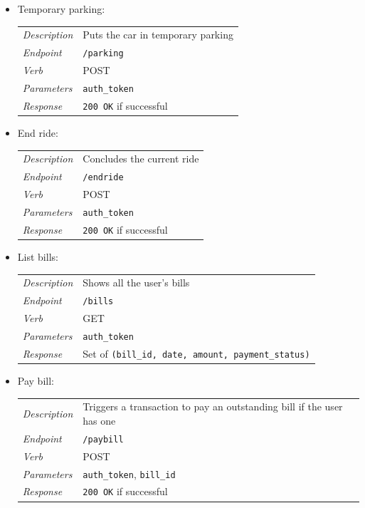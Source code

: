 \documentclass[english]{article}
\newcommand{\code}[1]{\texttt{#1}}
\begin{document}
\begin{itemize}
\begin{itemize}
	\item{Temporary parking:}\\
	\begin{tabular}{ | l l }
		\textit{Description} & Puts the car in temporary parking\\
		\textit{Endpoint} & \code{/parking} \\ 
		\textit{Verb} & POST \\  
		\textit{Parameters} & \code{auth\_token}  \\
		\textit{Response} & \code{200 OK} if successful
	\end{tabular}
	
	\item{End ride:}\\
	\begin{tabular}{ | l l }
		\textit{Description} & Concludes the current ride\\
		\textit{Endpoint} & \code{/endride} \\ 
		\textit{Verb} & POST \\  
		\textit{Parameters} & \code{auth\_token}  \\
		\textit{Response} & \code{200 OK} if successful
	\end{tabular}
	
	\item{List bills:}\\
	\begin{tabular}{ | l l }
		\textit{Description} & Shows all the user's bills\\
		\textit{Endpoint} & \code{/bills} \\ 
		\textit{Verb} & GET \\  
		\textit{Parameters} & \code{auth\_token}  \\
		\textit{Response} & Set of \code{(bill\_id, date, amount, payment\_status)}
	\end{tabular}
	
	\item{Pay bill:}\\
	\begin{tabular}{ | l l }
		\textit{Description} & Triggers a transaction to pay an outstanding bill if the user has one\\
		\textit{Endpoint} & \code{/paybill} \\ 
		\textit{Verb} & POST \\  
		\textit{Parameters} & \code{auth\_token}, \code{bill\_id}  \\
		\textit{Response} & \code{200 OK} if successful
	\end{tabular}


\end{itemize}
\end{itemize}
\end{document}
